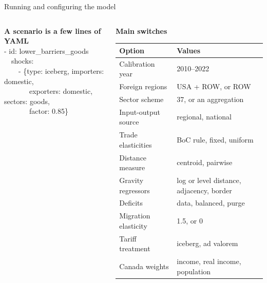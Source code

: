 \documentclass[aspectratio=169,9pt,t]{beamer}
\begin{document}
\begin{frame}{Running and configuring the model}
\begin{columns}[T]
\begin{column}{0.5\textwidth}
      \medskip
      \textbf{A scenario is a few lines of YAML}\\[0.2em]
      {\ttfamily\scriptsize
      - id: lower\_barriers\_goods\\
      \ \ shocks:\\
      \ \ \ \ - \{type: iceberg, importers: domestic,\\
      \ \ \ \ \ \ \ exporters: domestic, sectors: goods,\\
      \ \ \ \ \ \ \ factor: 0.85\}}
    \end{column}
    \begin{column}{0.46\textwidth}
      \small
      \textbf{Main switches}\\[0.2em]
      \begin{tabular}{@{}L{0.42\textwidth}L{0.48\textwidth}@{}}
        \toprule
        Option & Values\\
        \midrule
        Calibration year & 2010--2022\\
        Foreign regions & USA + ROW, or ROW\\
        Sector scheme & 37, or an aggregation\\
        Input-output source & regional, national\\
        Trade elasticities & BoC rule, fixed, uniform\\
        Distance measure & centroid, pairwise\\
        Gravity regressors & log or level distance, adjacency, border\\
        Deficits & data, balanced, purge\\
        Migration elasticity & 1.5, or 0\\
        Tariff treatment & iceberg, ad valorem\\
        Canada weights & income, real income, population\\
        \bottomrule
      \end{tabular}
    \end{column}
  \end{columns}
\end{frame}
\end{document}

